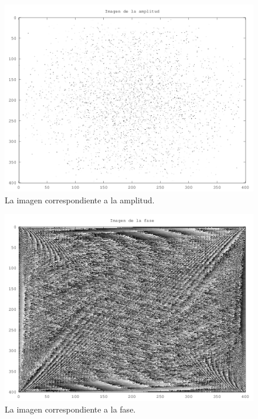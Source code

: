 \documentclass[twocolumn,a4paper,10pt]{article}
\begin{document}
\begin{figure}[H]
        \includegraphics[width=\linewidth]{../images/amplitude.png}
        \caption{La imagen correspondiente a la amplitud.}
        \label{fig:amplitude}
\end{figure}

\begin{figure}[H]
        \includegraphics[width=\linewidth]{../images/phase.png}
        \caption{La imagen correspondiente a la fase.}
        \label{fig:phase}
\end{figure}
\end{document}
